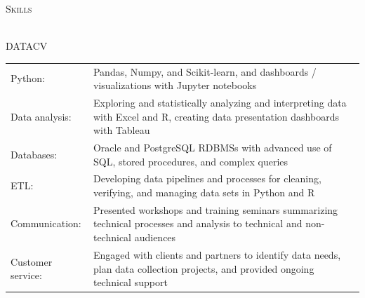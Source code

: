 \documentclass[letterpaper]{article}
\newcommand{\lineunder} {
        \vspace*{-8pt} \\
        \hspace*{-18pt} \hrulefill \\
    }
\newcommand{\header} [1] {
        {\hspace*{-18pt}\vspace*{6pt} \textsc{#1}}
        \vspace*{-6pt} \lineunder
        \vspace{1mm}
    }
\begin{document}
\header{Skills}
    \begin{taggedblock}{DATACV}
        \begin{tabular}[t]{ l L{5.17in} }
            Python: &
                Pandas, Numpy, and Scikit-learn, and dashboards / visualizations with
                Jupyter notebooks \\
            Data analysis: &                 
                Exploring and statistically analyzing and interpreting data with
                Excel and R,  
                creating data presentation dashboards with Tableau \\
            Databases: & 
                Oracle and PostgreSQL RDBMSs with advanced use of SQL, stored
                procedures, and complex queries \\
            ETL: & 
                Developing data pipelines and processes for cleaning, verifying,
                and managing data sets in Python and R \\
            Communication: &
                Presented workshops and training seminars summarizing technical
                processes and analysis to technical and non-technical audiences \\
            Customer service: &
                Engaged with clients and partners to identify data needs, plan data
                collection projects, and provided ongoing technical support \\
        \end{tabular}
    \end{taggedblock}
\end{document}
